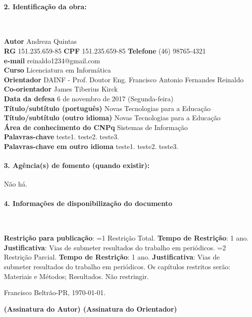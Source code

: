 \documentclass[12pt]{article}
\makeatletter
\def \titulotrabalho{Novas Tecnologias para a Educação}
\def \titulotrabalhoIngles{Novas Tecnologias para a Educação}
\def \areaCNPQ{Sistemas de Informação}
\def \palavraschaves{teste1. teste2. teste3.}
\def \palavraschavesIngles{teste1. teste2. teste3.}
\def \discente{Andreza Quintas}
\def \defesadatacompletacomdiadasemana{6 de novembro de 2017 (Segunda-feira)}
\def \proforientador{DAINF - Prof. Doutor Eng. Francisco Antonio Fernandes Reinaldo}
\def \profcoorientador{James Tiberius Kirck}
\def \email{reinaldo1234@gmail.com}
\def \telefonecomDDD{(46) 98765-4321}
\def \cpf{151.235.659-85}
\def \rg{151.235.659-85}
\def \agenciafomento{Não há.}
\newcommand{\restricao}[1]
{
  \ifnum#1=1
    Restrição Total. \textbf{Tempo de Restrição}: 1 ano. \textbf{Justificativa}: Vias de submeter resultados do trabalho em periódicos.
  \else
    \ifnum#1=2
    Restrição Parcial. \textbf{Tempo de Restrição}: 1 ano. \textbf{Justificativa}: Vias de submeter resultados do trabalho em periódicos. Os capítulos restritos serão: Materiais e Métodos; Resultados.
  \else
    Não restringir.
  \fi
\fi
}
\makeatother
\begin{document}
\paragraph{2. Identificação da obra:} {~}
\begin{flushleft}
\linespread{1.2} \selectfont
\noindent\textbf{Autor} \discente \\ 
\textbf{RG} \rg \hspace{2em} \textbf{CPF} \cpf \hspace{2em}  \textbf{Telefone} \telefonecomDDD \\
\textbf{e-mail} \email \\
\textbf{Curso} Licenciatura em Informática \\
\textbf{Orientador} \proforientador\\
\textbf{Co-orientador} \profcoorientador\\
\textbf{Data da defesa} \defesadatacompletacomdiadasemana\\
\textbf{Título/subtítulo (português)} \titulotrabalho\\
\textbf{Título/subtítulo (outro idioma)} \titulotrabalhoIngles\\
\textbf{Área de conhecimento do CNPq} \areaCNPQ\\
\textbf{Palavras-chave} \palavraschaves\\
\textbf{Palavras-chave em outro idioma} \palavraschavesIngles\\
\end{flushleft}

\paragraph{3. Agência(s) de fomento (quando existir):} \agenciafomento
\paragraph{4. Informações de disponibilização do documento} {~}
\begin{flushleft}
\linespread{1.3} \selectfont
\textbf{Restrição para publicação}: \restricao{1}
\end{flushleft}

\vspace{1em}

\hspace{\fill} Francisco Beltrão-PR, \today.

\vspace{2em}


\begin{center}
\small 
\textbf{(Assinatura do Autor) \hspace{8em} (Assinatura do Orientador)}
\end{center}
\end{document}
